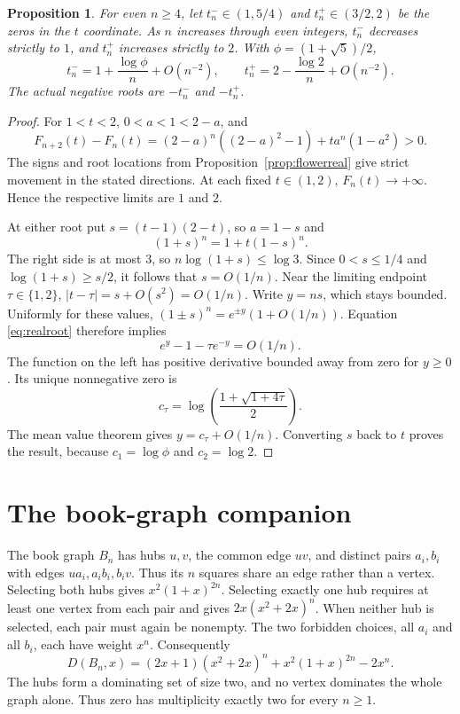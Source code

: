 \documentclass[11pt,a4paper]{article}
\newtheorem{proposition}[theorem]{Proposition}
\begin{document}
\begin{proposition}\label{prop:motion}
For even $n\ge4$, let $t_n^-\in(1,5/4)$ and $t_n^+\in(3/2,2)$ be the
zeros in the $t$ coordinate. As $n$ increases through even integers,
$t_n^-$ decreases strictly to $1$, and $t_n^+$ increases strictly to $2$.
With $\phi=(1+\sqrt5)/2$,
\[
 t_n^-=1+\frac{\log\phi}{n}+O(n^{-2}),\qquad
 t_n^+=2-\frac{\log2}{n}+O(n^{-2}).
\]
The actual negative roots are $-t_n^-$ and $-t_n^+$.
\end{proposition}
\begin{proof}
For $1<t<2$, $0<a<1<2-a$, and
\[
 F_{n+2}(t)-F_n(t)
 =(2-a)^n((2-a)^2-1)+ta^n(1-a^2)>0.
\]
The signs and root locations from Proposition~\ref{prop:flowerreal} give
strict movement in the stated directions. At each fixed $t\in(1,2)$,
$F_n(t)\to+\infty$. Hence the respective limits are $1$ and $2$.

At either root put $s=(t-1)(2-t)$, so $a=1-s$ and
\begin{equation}\label{eq:realroot}
 (1+s)^n=1+t(1-s)^n.
\end{equation}
The right side is at most $3$, so $n\log(1+s)\le\log3$.
Since $0<s\le1/4$ and $\log(1+s)\ge s/2$, it follows that $s=O(1/n)$.
Near the limiting endpoint $\tau\in\{1,2\}$,
$|t-\tau|=s+O(s^2)=O(1/n)$.
Write $y=ns$, which stays bounded. Uniformly for these values,
$(1\pm s)^n=e^{\pm y}(1+O(1/n))$.
Equation \eqref{eq:realroot} therefore implies
\[
 e^y-1-\tau e^{-y}=O(1/n).
\]
The function on the left has positive derivative bounded away from zero
for $y\ge0$. Its unique nonnegative zero is
\[
 c_\tau=\log\left(\frac{1+\sqrt{1+4\tau}}2\right).
\]
The mean value theorem gives $y=c_\tau+O(1/n)$.
Converting $s$ back to $t$ proves the result, because
$c_1=\log\phi$ and $c_2=\log2$.
\end{proof}

\section{The book-graph companion}
The book graph $B_n$ has hubs $u,v$, the common edge $uv$, and distinct
pairs $a_i,b_i$ with edges $ua_i,a_ib_i,b_iv$. Thus its $n$ squares share
an edge rather than a vertex.
Selecting both hubs gives $x^2(1+x)^{2n}$.
Selecting exactly one hub requires at least one vertex from each pair and
gives $2x(x^2+2x)^n$.
When neither hub is selected, each pair must again be nonempty.
The two forbidden choices, all $a_i$ and all $b_i$, each have weight $x^n$.
Consequently
\begin{equation}\label{eq:book}
 D(B_n,x)=(2x+1)(x^2+2x)^n+x^2(1+x)^{2n}-2x^n.
\end{equation}
The hubs form a dominating set of size two, and no vertex dominates the
whole graph alone. Thus zero has multiplicity exactly two for every $n\ge1$.
\end{document}
